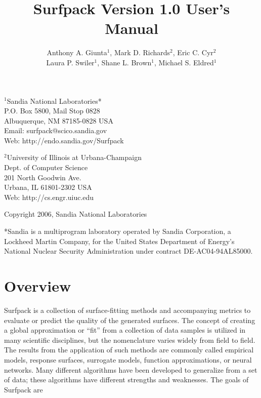 \documentclass{article}
\begin{document}
\title{Surfpack Version 1.0 User's Manual}

\author{Anthony A. Giunta$^1$, Mark D. Richards$^2$, Eric C. Cyr$^2$ \\Laura P. Swiler$^1$, Shane L. Brown$^1$, Michael S. Eldred$^1$}


\maketitle


\begin{center}
$^1$Sandia National Laboratories*\\P.O. Box 5800, Mail Stop 0828\\Albuquerque, NM 87185-0828 USA \\
Email: surfpack@scico.sandia.gov \\ Web: http://endo.sandia.gov/Surfpack
\end{center}

\bigbreak

\begin{center}
$^2$University of Illinois at Urbana-Champaign\\Dept. of Computer Science\\201 North Goodwin Ave.\\Urbana, IL 61801-2302 USA\\
Web: http://cs.engr.uiuc.edu
\end{center}

\bigbreak

\begin{center}
Copyright 2006, Sandia National Laboratories
\end{center}

\bigbreak

\begin{center}
*Sandia is a multiprogram laboratory operated by Sandia Corporation, a Lockheed Martin Company, 
for the United States Department of Energy's National Nuclear Security Administration under 
contract DE-AC04-94AL85000.
\end{center}







\pagebreak

\section {Overview}\label{sec:overview}
Surfpack is a collection of surface-fitting methods and accompanying metrics to evaluate or predict the quality of the generated surfaces.  The concept of creating a global approximation or ``fit'' from a collection of data samples is utilized in many scientific disciplines, but the nomenclature varies widely from field to field.  The results from the application of such methods are commonly called empirical models, response surfaces, surrogate models, function approximations, or neural networks.  Many different algorithms have been developed to generalize from a set of data; these algorithms have different strengths and weaknesses.  The goals of Surfpack are
\end{document}
